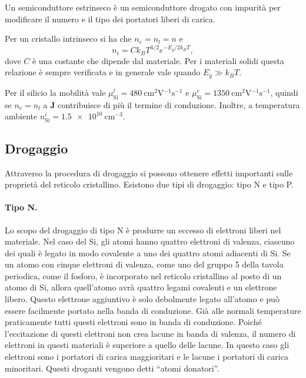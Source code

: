 \begin{defn}
    Un semiconduttore estrinseco è un semiconduttore drogato con impurità per modificare il numero e il tipo dei portatori liberi di carica.
\end{defn}
Per un cristallo intrinseco si ha che $n_e=n_l=n$ e 
\begin{equation}
    n_i=Ck_BT^{3/2}e^{-E_g/2k_BT},
\end{equation}
dove $C$ è una costante che dipende dal materiale. Per i materiali solidi questa relazione è sempre verificata e in generale vale quando $E_g\gg k_BT$.
\begin{obs}
    Per il silicio la mobilità vale $\mu_{\mathrm{Si}}^l=\SI{480}{\cm^2\V^{-1}\s^{-1}}$ e $\mu_{\mathrm{Si}}^e=\SI{1350}{\cm^2\V^{-1}\s^{-1}}$, quindi se $n_e=n_l$ a $\bm{J}$ contribuisce di più il termine di conduzione. Inoltre, a temperatura ambiente $n_{\mathrm{Si}}^i=\SI{1.5e10}{\cm^{-3}}$.
\end{obs}

\subsection{Drogaggio}
Attraverso la procedura di drogaggio si possono ottenere effetti importanti sulle proprietà del reticolo cristallino.
Esistono due tipi di drogaggio: tipo N e tipo P.

\paragraph{Tipo N.} Lo scopo del drogaggio di tipo N è produrre un eccesso di elettroni liberi nel materiale. Nel caso del Si, gli atomi hanno quattro elettroni di valenza, ciascuno dei quali è legato in modo covalente a uno dei quattro atomi adiacenti di Si. Se un atomo con cinque elettroni di valenza, come uno del gruppo 5 della tavola periodica, come il fosforo, è incorporato nel reticolo cristallino al posto di un atomo di Si, allora quell'atomo avrà quattro legami covalenti e un elettrone libero. Questo elettrone aggiuntivo è solo debolmente legato all'atomo e può essere facilmente portato nella banda di conduzione. Già alle normali temperature praticamente tutti questi elettroni sono in banda di conduzione. Poiché l'eccitazione di questi elettroni non crea lacune in banda di valenza, il numero di elettroni in questi materiali è superiore a quello delle lacune. In questo caso gli elettroni sono i portatori di carica maggioritari e le lacune i portatori di carica minoritari. Questi droganti vengono detti ``atomi donatori''.
